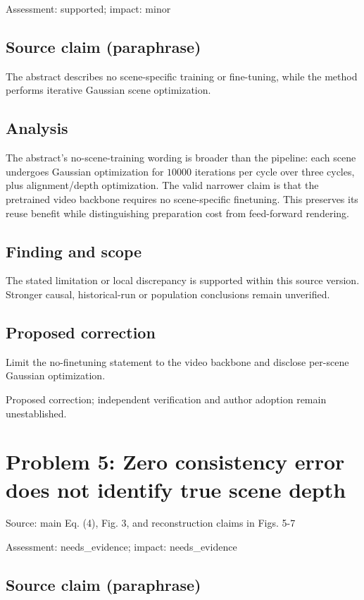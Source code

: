 \documentclass[11pt]{article}
\begin{document}
Assessment: supported; impact: minor

\subsection*{Source claim (paraphrase)}

The abstract describes no scene-specific training or fine-tuning, while the method performs iterative Gaussian scene optimization.

\subsection*{Analysis}

The abstract's no-scene-training wording is broader than the pipeline: each scene undergoes Gaussian optimization for \(10000\) iterations per cycle over three cycles, plus alignment/depth optimization. The valid narrower claim is that the pretrained video backbone requires no scene-specific finetuning. This preserves its reuse benefit while distinguishing preparation cost from feed-forward rendering.

\subsection*{Finding and scope}

The stated limitation or local discrepancy is supported within this source version. Stronger causal, historical-run or population conclusions remain unverified.

\subsection*{Proposed correction}

Limit the no-finetuning statement to the video backbone and disclose per-scene Gaussian optimization.

Proposed correction; independent verification and author adoption remain unestablished.

\section*{Problem 5: Zero consistency error does not identify true scene depth}

Source: main Eq. (4), Fig. 3, and reconstruction claims in Figs. 5-7

Assessment: needs\_evidence; impact: needs\_evidence

\subsection*{Source claim (paraphrase)}
\end{document}
